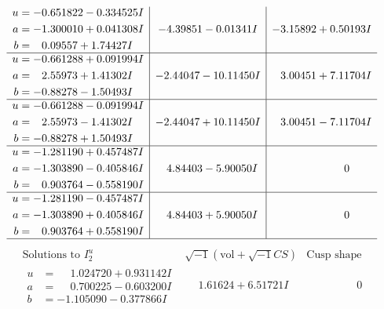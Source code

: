 \documentclass[1p]{elsarticle_modified}
\theoremstyle{definition}
\newcommand{\I}{\sqrt{-1}}
\begin{document}
$$\begin{array}{c|c|c}
\begin{aligned}
u &= -0.651822 - 0.334525 I \\
a &= -1.300010 + 0.041308 I \\
b &= \phantom{-}0.09557 + 1.74427 I\end{aligned}
 & -4.39851 - 0.01341 I & -3.15892 + 0.50193 I \\ \hline\begin{aligned}
u &= -0.661288 + 0.091994 I \\
a &= \phantom{-}2.55973 + 1.41302 I \\
b &= -0.88278 - 1.50493 I\end{aligned}
 & -2.44047 - 10.11450 I & \phantom{-}3.00451 + 7.11704 I \\ \hline\begin{aligned}
u &= -0.661288 - 0.091994 I \\
a &= \phantom{-}2.55973 - 1.41302 I \\
b &= -0.88278 + 1.50493 I\end{aligned}
 & -2.44047 + 10.11450 I & \phantom{-}3.00451 - 7.11704 I \\ \hline\begin{aligned}
u &= -1.281190 + 0.457487 I \\
a &= -1.303890 - 0.405846 I \\
b &= \phantom{-}0.903764 - 0.558190 I\end{aligned}
 & \phantom{-}4.84403 - 5.90050 I & \phantom{-0.000000 } 0 \\ \hline\begin{aligned}
u &= -1.281190 - 0.457487 I \\
a &= -1.303890 + 0.405846 I \\
b &= \phantom{-}0.903764 + 0.558190 I\end{aligned}
 & \phantom{-}4.84403 + 5.90050 I & \phantom{-0.000000 } 0\\
 \hline 
 \end{array}$$\newpage$$\begin{array}{c|c|c}  
\text{Solutions to }I^u_{2}& \I (\text{vol} + \sqrt{-1}CS) & \text{Cusp shape}\\
 \hline 
\begin{aligned}
u &= \phantom{-}1.024720 + 0.931142 I \\
a &= \phantom{-}0.700225 - 0.603200 I \\
b &= -1.105090 - 0.377866 I\end{aligned}
 & \phantom{-}1.61624 + 6.51721 I & \phantom{-0.000000 } 0 \\ \hline\begin{aligned}

\end{aligned}
\end{array}$$
\end{document}
